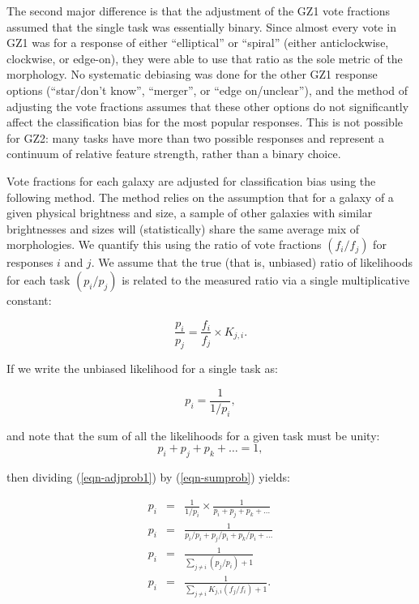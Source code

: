 \documentclass[useAMS,usenatbib]{mn2e}
\begin{document}
The second major difference is that the adjustment of the GZ1 vote fractions assumed that the single task was essentially binary. Since almost every vote in GZ1 was for a response of either ``elliptical'' or ``spiral'' (either anticlockwise, clockwise, or edge-on), they were able to use that ratio as the sole metric of the morphology. No systematic debiasing was done for the other GZ1 response options (``star/don't know'', ``merger'', or ``edge on/unclear''), and the method of adjusting the vote fractions assumes that these other options do not significantly affect the classification bias for the most popular responses. This is not possible for GZ2: many tasks have more than two possible responses and represent a continuum of relative feature strength, rather than a binary choice.

Vote fractions for each galaxy are adjusted for classification bias using the following method. The method relies on the assumption that for a galaxy of a given physical brightness and size, a sample of other galaxies with similar brightnesses and sizes will (statistically) share the same average mix of morphologies. We quantify this using the ratio of vote fractions $(f_i/f_j)$ for responses $i$ and $j$. We assume that the true (that is, unbiased) ratio of likelihoods for each task $(p_i/p_j)$ is related to the measured ratio via a single multiplicative constant:

\begin{equation}
\frac{p_i}{p_j} = \frac{f_i}{f_j}\times K_{j,i}.
\label{eqn-kdef}
\end{equation}

\noindent If we write the unbiased likelihood for a single task as:

\begin{equation}
p_i = \frac{1}{1/p_i},
\label{eqn-adjprob1}
\end{equation}

\noindent and note that the sum of all the likelihoods for a given task must be unity:
\begin{equation}
p_i + p_j + p_k + \dots = 1,
\label{eqn-sumprob}
\end{equation}

\noindent then dividing (\ref{eqn-adjprob1}) by (\ref{eqn-sumprob}) yields:

\begin{eqnarray}
p_i &=& \frac{1}{1/p_i} \times \frac{1}{p_i + p_j + p_k + \dots} \\
p_i &=& \frac{1}{p_i/p_i + p_j/p_i + p_k/p_i + \dots} \\
p_i &=& \frac{1}{\sum\limits_{j\ne i}{(p_j/p_i)} + 1} \\
p_i &=& \frac{1}{\sum\limits_{j\ne i}{K_{j,i} (f_j/f_i)} + 1}.
\label{eqnarray-adjprob2}
\end{eqnarray}
\end{document}

